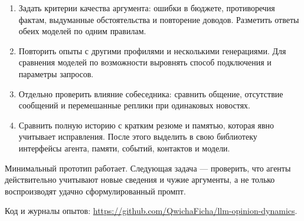 \documentclass[12pt,a4paper]{article}
\begin{document}
\begin{enumerate}
    \item Задать критерии качества аргумента: ошибки в бюджете,
    противоречия фактам, выдуманные обстоятельства и повторение доводов.
    Разметить ответы обеих моделей по одним правилам.
    \item Повторить опыты с другими профилями и несколькими генерациями.
    Для сравнения моделей по возможности выровнять способ подключения
    и параметры запросов.
    \item Отдельно проверить влияние собеседника: сравнить общение,
    отсутствие сообщений и перемешанные реплики при одинаковых новостях.
    \item Сравнить полную историю с кратким резюме и памятью,
    которая явно учитывает исправления. После этого выделить в свою
    библиотеку интерфейсы агента, памяти, событий, контактов и модели.
\end{enumerate}

Минимальный прототип работает. Следующая задача --- проверить,
что агенты действительно учитывают новые сведения и чужие аргументы,
а не только воспроизводят удачно сформулированный промпт.

\smallskip
\noindent Код и журналы опытов:
\url{https://github.com/QwichaFicha/llm-opinion-dynamics}.
\end{document}
